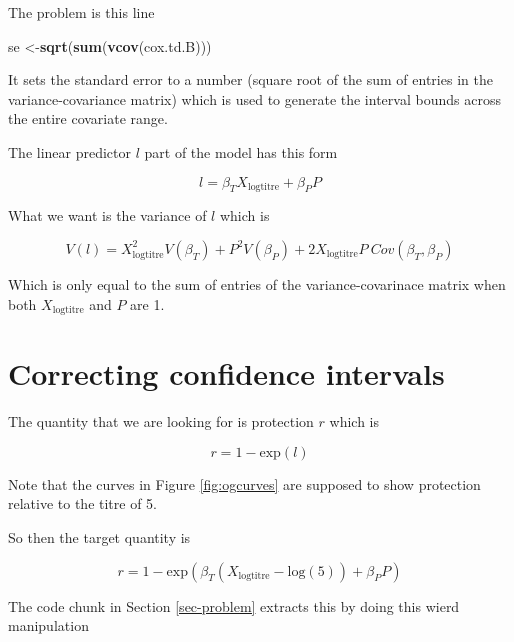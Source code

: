 \documentclass[]{article}
\newenvironment{Shaded}{\begin{snugshade}}{\end{snugshade}}
\newcommand{\DecValTok}[1]{\textcolor[rgb]{0.00,0.00,0.81}{#1}}
\newcommand{\KeywordTok}[1]{\textcolor[rgb]{0.13,0.29,0.53}{\textbf{#1}}}
\newcommand{\NormalTok}[1]{#1}
\newcommand{\OperatorTok}[1]{\textcolor[rgb]{0.81,0.36,0.00}{\textbf{#1}}}
\begin{document}
The problem is this line

\begin{Shaded}
\begin{Highlighting}[]
\NormalTok{se <-}\KeywordTok{sqrt}\NormalTok{(}\KeywordTok{sum}\NormalTok{(}\KeywordTok{vcov}\NormalTok{(cox.td.B)))}
\end{Highlighting}
\end{Shaded}

It sets the standard error to a number (square root of the sum of entries in the variance-covariance matrix) which is used to generate the interval bounds across the entire covariate range.

The linear predictor \(l\) part of the model has this form

\[
l=\beta_TX_\text{logtitre}+\beta_PP
\]

What we want is the variance of \(l\) which is

\[
V(l)=X_\text{logtitre}^2V(\beta_T)+P^2V(\beta_P)+2X_\text{logtitre}P\ Cov(\beta_T,\beta_P)
\]

Which is only equal to the sum of entries of the variance-covarinace matrix when both \(X_\text{logtitre}\) and \(P\) are 1.

\hypertarget{correcting-confidence-intervals}{%
\section{Correcting confidence intervals}\label{correcting-confidence-intervals}}

The quantity that we are looking for is protection \(r\) which is

\[
r=1-\text{exp}(l)
\]

Note that the curves in Figure \ref{fig:ogcurves} are supposed to show protection relative to the titre of 5.

So then the target quantity is

\[
r=1-\text{exp}(\beta_T(X_\text{logtitre}-\text{log}(5))+\beta_PP)
\]

The code chunk in Section \ref{sec-problem} extracts this by doing this wierd manipulation

\begin{Shaded}
\end{Shaded}
\end{document}

